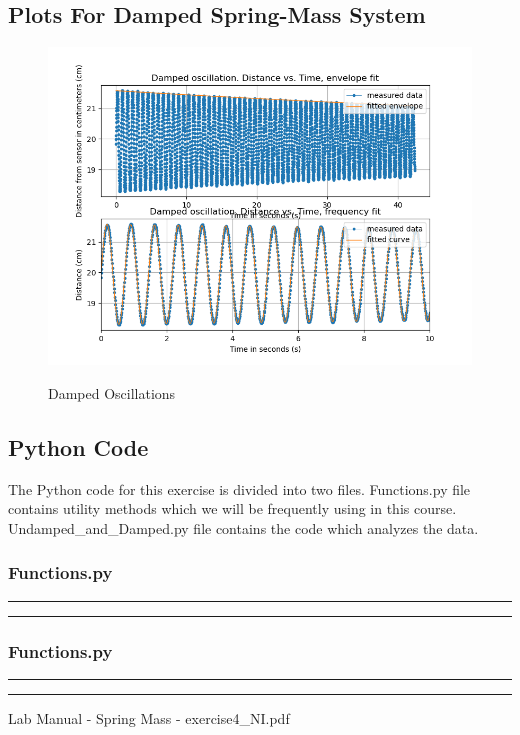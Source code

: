 \documentclass[letterpaper,12pt]{article}
\begin{document}
\subsection{Plots For Damped Spring-Mass  System}
\begin{figure}[H]
  \centering
  \includegraphics[width=0.95\linewidth]{../Fredrik/Damped oscillation. Distance vs. Time.png}    
  \begin{center}
    \emph{}
  \end{center}
  \caption{Damped Oscillations}
  \label{damped-plot}
\end{figure}

\pagebreak

\subsection{Python Code}

The Python code for this exercise is divided into two files. Functions.py file contains utility methods
which we will be frequently using in this course. Undamped\_and\_Damped.py file contains the code which analyzes
the data.

\subsubsection{Functions.py}
\noindent\rule{\textwidth}{1pt}

\noindent\rule{\textwidth}{1pt}

\subsubsection{Functions.py}
\noindent\rule{\textwidth}{1pt}

\noindent\rule{\textwidth}{1pt}

\pagebreak

\begin{thebibliography}{99}

 Lab Manual - Spring Mass - exercise4\_NI.pdf

\end{thebibliography}
\end{document}
